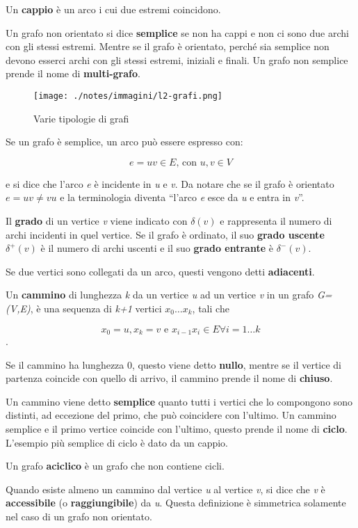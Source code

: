 Un \textbf{cappio} è un arco i cui due estremi coincidono.

Un grafo non orientato si dice \textbf{semplice} se non ha cappi e non
ci sono due archi con gli stessi estremi. Mentre se il grafo è
orientato, perché sia semplice non devono esserci archi con gli stessi
estremi, iniziali e finali. Un grafo non semplice prende il nome di
\textbf{multi-grafo}.

\begin{figure}[htbp]
\centering
\texttt{[image: ./notes/immagini/l2-grafi.png]}
\caption{Varie tipologie di grafi}
\end{figure}

Se un grafo è semplice, un arco può essere espresso con:

$$
e = uv \in E \text{, con } u,v \in V
$$

e si dice che l'arco \emph{e} è incidente in \emph{u} e \emph{v}. Da
notare che se il grafo è orientato
$e = uv \neq vu$ e la terminologia diventa
``l'arco \emph{e} esce da \emph{u} e entra in \emph{v}''.

Il \textbf{grado} di un vertice \emph{v} viene indicato con $\delta(v)$ e rappresenta il numero di archi incidenti in quel
vertice. Se il grafo è ordinato, il suo \textbf{grado uscente} $\delta^+(v)$ è il numero di archi uscenti e il suo \textbf{grado entrante} è $\delta^-(v)$.

Se due vertici sono collegati da un arco, questi vengono detti
\textbf{adiacenti}.

Un \textbf{cammino} di lunghezza \emph{k} da un vertice \emph{u} ad un
vertice \emph{v} in un grafo \emph{G=(V,E)}, è una sequenza di
\emph{k+1} vertici $x_0 \ldots x_k$, tali che 

$$x_0 = u, x_k = v \text{ e } x_{i-1}x_i \in E \forall i = 1\ldots k $$.

Se il cammino ha lunghezza 0, questo viene detto \textbf{nullo}, mentre
se il vertice di partenza coincide con quello di arrivo, il cammino
prende il nome di \textbf{chiuso}.

Un cammino viene detto \textbf{semplice} quanto tutti i vertici che lo
compongono sono distinti, ad eccezione del primo, che può coincidere
con l'ultimo. Un cammino semplice e il primo vertice coincide con
l'ultimo, questo prende il nome di \textbf{ciclo}. L'esempio più
semplice di ciclo è dato da un cappio.

Un grafo \textbf{aciclico} è un grafo che non contiene cicli.

Quando esiste almeno un cammino dal vertice \emph{u} al vertice
\emph{v}, si dice che \emph{v} è \textbf{accessibile} (o
\textbf{raggiungibile}) da \emph{u}. Questa definizione è simmetrica
solamente nel caso di un grafo non orientato.

